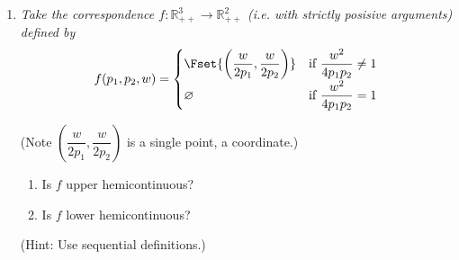 \documentclass{article}
\begin{document}
\begin{enumerate}[1.]
  \item {\itshape
    Take the correspondence $f: \mathbb{R}^3_{++} \to \mathbb{R}^2_{++}$ (i.e. with strictly posisive arguments) defined by
    \[
      f(p_1, p_2, w)
      =
      \begin{cases}
        \Fset{
          \left(\dfrac{w}{2p_1}, \dfrac{w}{2 p_2}\right)
        }
          & \text{if } \dfrac{w^2}{4 p_1 p_2} \ne 1 \\[6pt]
        \varnothing
          & \text{if } \dfrac{w^2}{4 p_1 p_2} = 1
      \end{cases}
    \]

    (Note $\left(\dfrac{w}{2p_1}, \dfrac{w}{2 p_2}\right)$ is a single point, a coordinate.)
    \begin{enumerate}
      \item Is $f$ upper hemicontinuous?

      \item Is $f$ lower hemicontinuous?
    \end{enumerate}

    (Hint: Use sequential definitions.)
  }
\end{enumerate}

\end{document}
